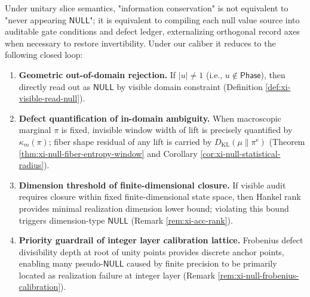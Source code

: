 \begin{remark}\label{rem:xi-null-conservation-closure}
Under unitary slice semantics, "information conservation" is not equivalent to "never appearing \(\mathsf{NULL}\)"; it is equivalent to compiling each null value source into auditable gate conditions and defect ledger, externalizing orthogonal record axes when necessary to restore invertibility.
Under our caliber it reduces to the following closed loop:
\begin{enumerate}
  \item \textbf{Geometric out-of-domain rejection.} If \(|u|\neq 1\) (i.e., \(u\notin\mathsf{Phase}\)), then directly read out as \(\mathsf{NULL}\) by visible domain constraint (Definition \ref{def:xi-visible-read-null}).
  \item \textbf{Defect quantification of in-domain ambiguity.} When macroscopic marginal \(\pi\) is fixed, invisible window width of lift is precisely quantified by \(\kappa_m(\pi)\); fiber shape residual of any lift is carried by \(D_{\mathrm{KL}}(\mu\|\pi^{\mathrm{e}})\) (Theorem \ref{thm:xi-null-fiber-entropy-window} and Corollary \ref{cor:xi-null-statistical-radius}).
  \item \textbf{Dimension threshold of finite-dimensional closure.} If visible audit requires closure within fixed finite-dimensional state space, then Hankel rank provides minimal realization dimension lower bound; violating this bound triggers dimension-type \(\mathsf{NULL}\) (Remark \ref{rem:xi-acc-rank}).
  \item \textbf{Priority guardrail of integer layer calibration lattice.} Frobenius defect divisibility depth at root of unity points provides discrete anchor points, enabling many pseudo-\(\mathsf{NULL}\) caused by finite precision to be primarily located as realization failure at integer layer (Remark \ref{rem:xi-null-frobenius-calibration}).
\end{enumerate}
\end{remark}

